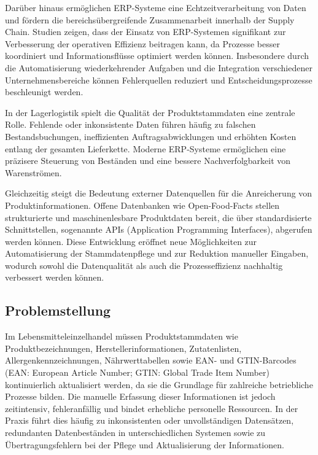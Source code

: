 \documentclass[12pt,a4paper]{article}
\begin{document}
Darüber hinaus ermöglichen ERP-Systeme eine Echtzeitverarbeitung von Daten und fördern die bereichsübergreifende Zusammenarbeit innerhalb der Supply Chain. Studien zeigen, dass der Einsatz von ERP-Systemen signifikant zur Verbesserung der operativen Effizienz beitragen kann, da Prozesse besser koordiniert und Informationsflüsse optimiert werden können. \autocite[Vgl.][]{chopra2016} Insbesondere durch die Automatisierung wiederkehrender Aufgaben und die Integration verschiedener Unternehmensbereiche können Fehlerquellen reduziert und Entscheidungsprozesse beschleunigt werden. \autocite[Vgl.][]{chang2014}

In der Lagerlogistik spielt die Qualität der Produktstammdaten eine zentrale Rolle. Fehlende oder inkonsistente Daten führen häufig zu falschen Bestandsbuchungen, ineffizienten Auftragsabwicklungen und erhöhten Kosten entlang der gesamten Lieferkette. Moderne ERP-Systeme ermöglichen eine präzisere Steuerung von Beständen und eine bessere Nachverfolgbarkeit von Warenströmen. \autocite[Vgl.][]{chopra2016}

Gleichzeitig steigt die Bedeutung externer Datenquellen für die Anreicherung von Produktinformationen. Offene Datenbanken wie Open-Food-Facts stellen strukturierte und maschinenlesbare Produktdaten bereit, die über standardisierte Schnittstellen, sogenannte APIs (Application Programming Interfaces), abgerufen werden können. Diese Entwicklung eröffnet neue Möglichkeiten zur Automatisierung der Stammdatenpflege und zur Reduktion manueller Eingaben, wodurch sowohl die Datenqualität als auch die Prozesseffizienz nachhaltig verbessert werden können. \autocite[Vgl.][]{openfoodfacts2026barcode}

\subsection{Problemstellung}

Im Lebensmitteleinzelhandel müssen Produktstammdaten wie Produktbezeichnungen, Herstellerinformationen, Zutatenlisten, Allergenkennzeichnungen, Nährwerttabellen sowie EAN- und GTIN-Barcodes (EAN: European Article Number; GTIN: Global Trade Item Number) kontinuierlich aktualisiert werden, da sie die Grundlage für zahlreiche betriebliche Prozesse bilden. Die manuelle Erfassung dieser Informationen ist jedoch zeitintensiv, fehleranfällig und bindet erhebliche personelle Ressourcen. In der Praxis führt dies häufig zu inkonsistenten oder unvollständigen Datensätzen, redundanten Datenbeständen in unterschiedlichen Systemen sowie zu Übertragungsfehlern bei der Pflege und Aktualisierung der Informationen.
\end{document}
